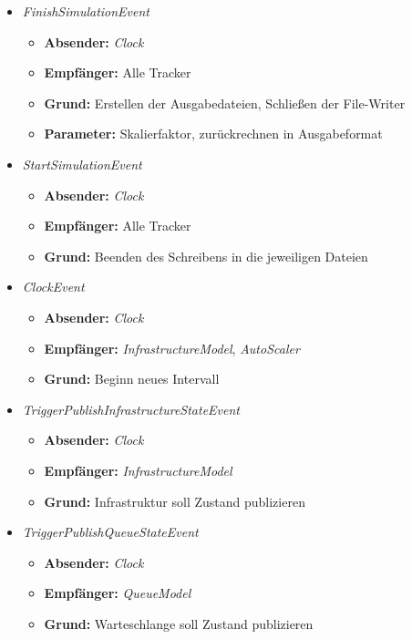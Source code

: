 \begin{itemize}


	\item \textit{FinishSimulationEvent} 
	\begin{itemize}
         \item \textbf{Absender:} \textit{Clock}
         \item \textbf{Empfänger:} Alle Tracker
         \item \textbf{Grund:} Erstellen der Ausgabedateien, Schließen der File-Writer
         \item \textbf{Parameter:} Skalierfaktor, zurückrechnen in Ausgabeformat
 	\end{itemize} 
     
    	\item \textit{StartSimulationEvent} 
    \begin{itemize}
    	\item \textbf{Absender:} \textit{Clock}
    	\item \textbf{Empfänger:} Alle Tracker
    	\item \textbf{Grund:} Beenden des Schreibens in die jeweiligen Dateien
    \end{itemize} 

\pagebreak

	\item \textit{ClockEvent} 
\begin{itemize}
	\item \textbf{Absender:} \textit{Clock}
	\item \textbf{Empfänger:} \textit{InfrastructureModel}, \textit{AutoScaler}
	\item \textbf{Grund:} Beginn neues Intervall
\end{itemize} 

	\item \textit{TriggerPublishInfrastructureStateEvent} 
\begin{itemize}
	\item \textbf{Absender:} \textit{Clock}
	\item \textbf{Empfänger:}  \textit{InfrastructureModel}
	\item \textbf{Grund:} Infrastruktur soll Zustand publizieren
\end{itemize} 

	\item \textit{TriggerPublishQueueStateEvent} 
\begin{itemize}
	\item \textbf{Absender:} \textit{Clock}
	\item \textbf{Empfänger:} \textit{QueueModel}
	\item \textbf{Grund:} Warteschlange soll Zustand publizieren
\end{itemize} 


\end{itemize}
